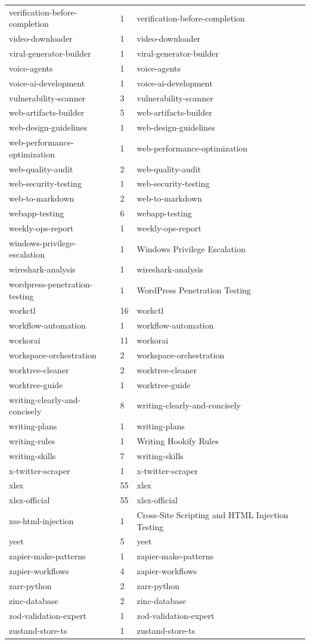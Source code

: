 \begin{longtable}{@{}lll@{}}
verification-before-completion & 1 & verification-before-completion\\
video-downloader & 1 & video-downloader\\
viral-generator-builder & 1 & viral-generator-builder\\
voice-agents & 1 & voice-agents\\
voice-ai-development & 1 & voice-ai-development\\
vulnerability-scanner & 3 & vulnerability-scanner\\
web-artifacts-builder & 5 & web-artifacts-builder\\
web-design-guidelines & 1 & web-design-guidelines\\
web-performance-optimization & 1 & web-performance-optimization\\
web-quality-audit & 2 & web-quality-audit\\
web-security-testing & 1 & web-security-testing\\
web-to-markdown & 2 & web-to-markdown\\
webapp-testing & 6 & webapp-testing\\
weekly-ops-report & 1 & weekly-ops-report\\
windows-privilege-escalation & 1 & Windows Privilege Escalation\\
wireshark-analysis & 1 & wireshark-analysis\\
wordpress-penetration-testing & 1 & WordPress Penetration Testing\\
workctl & 16 & workctl\\
workflow-automation & 1 & workflow-automation\\
workorai & 11 & workorai\\
workspace-orchestration & 2 & workspace-orchestration\\
worktree-cleaner & 2 & worktree-cleaner\\
worktree-guide & 1 & worktree-guide\\
writing-clearly-and-concisely & 8 & writing-clearly-and-concisely\\
writing-plans & 1 & writing-plans\\
writing-rules & 1 & Writing Hookify Rules\\
writing-skills & 7 & writing-skills\\
x-twitter-scraper & 1 & x-twitter-scraper\\
xlsx & 55 & xlsx\\
xlsx-official & 55 & xlsx-official\\
xss-html-injection & 1 & Cross-Site Scripting and HTML Injection Testing\\
yeet & 5 & yeet\\
zapier-make-patterns & 1 & zapier-make-patterns\\
zapier-workflows & 4 & zapier-workflows\\
zarr-python & 2 & zarr-python\\
zinc-database & 2 & zinc-database\\
zod-validation-expert & 1 & zod-validation-expert\\
zustand-store-ts & 1 & zustand-store-ts\\
\bottomrule
\end{longtable}

